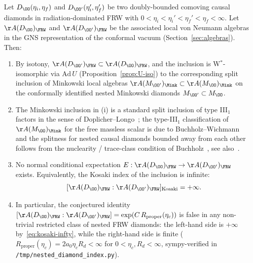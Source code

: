 \begin{theorem}\label{thm:nested-index}
Let $D_\OO(\eta_i,\eta_f)$ and $D_{\OO'}(\eta_i',\eta_f')$ be two
doubly-bounded comoving causal diamonds in radiation-dominated FRW with
$0<\eta_i<\eta_i'<\eta_f'<\eta_f<\infty$. Let $\AA(D_\OO)_\FRW$ and
$\AA(D_{\OO'})_\FRW$ be the associated local von Neumann algebras in the
GNS representation of the conformal vacuum (Section~\ref{sec:algebras}).
Then:
\begin{enumerate}
\item[(i)] By isotony, $\AA(D_{\OO'})_\FRW \subset \AA(D_\OO)_\FRW$, and the
inclusion is W$^*$-isomorphic via $\mathrm{Ad}\,U$ (Proposition~\ref{prop:U-iso})
to the corresponding split inclusion of Minkowski local algebras
$\AA(M_{\OO'})_\Mink \subset \AA(M_\OO)_\Mink$ on the conformally identified
nested Minkowski diamonds $M_{\OO'}\subset M_\OO$.

\item[(ii)] The Minkowski inclusion in (i) is a standard split inclusion of
type III$_1$ factors in the sense of Doplicher--Longo~\cite{DoplicherLongo1984};
the type-III$_1$ classification of $\AA(M_\OO)_\Mink$ for the free massless
scalar is due to Buchholz--Wichmann~\cite{BuchholzWichmann1986} and the
splitness for nested causal diamonds bounded away from each other follows from
the nuclearity / trace-class condition of Buchholz~\cite{Buchholz1974}, see
also~\cite{BuchholzDAntoniLongo1990}.

\item[(iii)] No normal conditional expectation
$E : \AA(D_\OO)_\FRW \to \AA(D_{\OO'})_\FRW$ exists. Equivalently, the Kosaki
index of the inclusion is infinite:
\begin{equation}\label{eq:kosaki-infty}
[\AA(D_\OO)_\FRW : \AA(D_{\OO'})_\FRW]_{\mathrm{Kosaki}} = +\infty.
\end{equation}

\item[(iv)] In particular, the conjectured identity
$[\AA(D_\OO)_\FRW : \AA(D_{\OO'})_\FRW] = \exp(C\,R_{\text{proper}}(\eta_c))$
is false in any non-trivial restricted class of nested FRW diamonds: the
left-hand side is $+\infty$ by~\eqref{eq:kosaki-infty}, while the right-hand
side is finite ($R_{\text{proper}}(\eta_c) = 2 a_0 \eta_c R_d <\infty$ for
$0<\eta_c, R_d<\infty$, sympy-verified in
\texttt{/tmp/nested\_diamond\_index.py}).
\end{enumerate}
\end{theorem}

